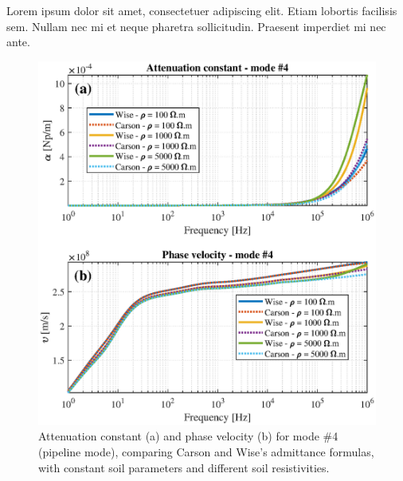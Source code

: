 \documentclass[lettersize,journal]{IEEEtran}
\newcommand*{\shortblindtext}{Lorem ipsum dolor sit amet, consectetuer adipiscing elit. Etiam lobortis facilisis sem. Nullam nec mi et neque pharetra sollicitudin. Praesent imperdiet mi nec ante.}
\begin{document}
\shortblindtext
\begin{figure}[tbh]
	\centering
	\label{fig:WisCarPropag_noratio___const_model_mode4}
	\includegraphics[width=1\columnwidth]{./fig/WisCarPropag_noratio___const_model_mode4.eps}
	\caption{Attenuation constant (a) and phase velocity (b) for mode \#4 (pipeline mode), comparing Carson and Wise's admittance formulas, with constant soil parameters and different soil resistivities.}
\end{figure}
\end{document}
